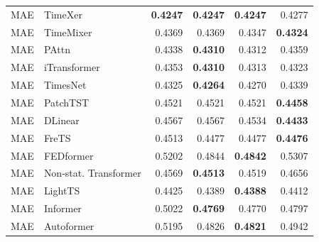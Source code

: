 \begin{longtable}{llrrrr}
MAE & TimeXer & \textbf{0.4247} & \textbf{0.4247} & \textbf{0.4247} & 0.4277 \\
MAE & TimeMixer & 0.4369 & 0.4369 & 0.4347 & \textbf{0.4324} \\
MAE & PAttn & 0.4338 & \textbf{0.4310} & 0.4312 & 0.4359 \\
MAE & iTransformer & 0.4353 & \textbf{0.4310} & 0.4313 & 0.4323 \\
MAE & TimesNet & 0.4325 & \textbf{0.4264} & 0.4270 & 0.4339 \\
MAE & PatchTST & 0.4521 & 0.4521 & 0.4521 & \textbf{0.4458} \\
MAE & DLinear & 0.4567 & 0.4567 & 0.4534 & \textbf{0.4433} \\
MAE & FreTS & 0.4513 & 0.4477 & 0.4477 & \textbf{0.4476} \\
MAE & FEDformer & 0.5202 & 0.4844 & \textbf{0.4842} & 0.5307 \\
MAE & Non-stat. Transformer & 0.4569 & \textbf{0.4513} & 0.4519 & 0.4656 \\
MAE & LightTS & 0.4425 & 0.4389 & \textbf{0.4388} & 0.4412 \\
MAE & Informer & 0.5022 & \textbf{0.4769} & 0.4770 & 0.4797 \\
MAE & Autoformer & 0.5195 & 0.4826 & \textbf{0.4821} & 0.4942 \\
\end{longtable}
\endgroup
